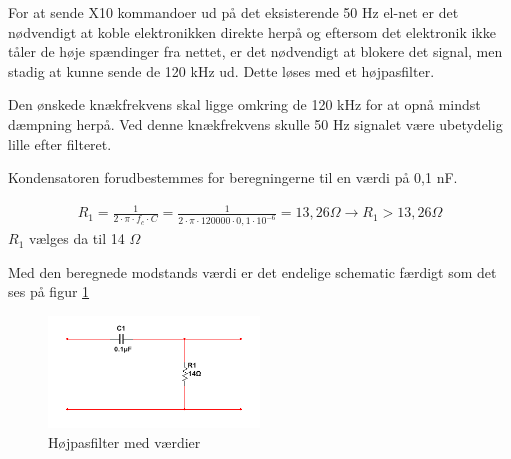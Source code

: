 For at sende X10 kommandoer ud på det eksisterende 50 Hz el-net er det nødvendigt at koble elektronikken direkte herpå og eftersom det elektronik ikke tåler de høje spændinger fra nettet, er det nødvendigt at blokere det signal, men stadig at kunne sende de 120 kHz ud. Dette løses med et højpasfilter.

Den ønskede knækfrekvens skal ligge omkring de 120 kHz for at opnå mindst dæmpning herpå. Ved denne knækfrekvens skulle 50 Hz signalet være ubetydelig lille efter filteret. 

Kondensatoren forudbestemmes for beregningerne til en værdi på 0,1 nF.

\begin{align}
R_1 = \frac{1}{2 \cdot \pi \cdot f_c \cdot C } = \frac{1}{2 \cdot \pi \cdot 120000 \cdot 0,1 \cdot 10^{-6}} = 13,26 \Omega
\rightarrow R_1 > 13,26 \Omega
\end{align}
$R_1$ vælges da til 14 $\Omega$

Med den beregnede modstands værdi er det endelige schematic færdigt som det ses på figur \ref{fig:HP_MV}

\begin{figure}[htbp]
	\centering
	\includegraphics[width=0.50\textwidth]{billeder/HWdesign/HP_MV.png}
	\caption{Højpasfilter med værdier}
	\label{fig:HP_MV}
\end{figure}

\newpage
  
